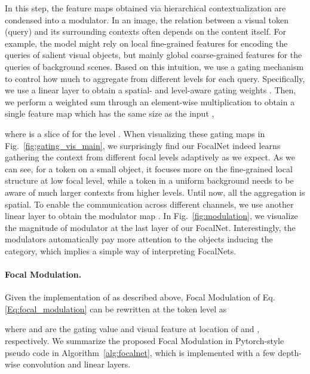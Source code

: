 \documentclass{article}
\begin{document}
In this step, the  feature maps obtained via hierarchical contextualization are condensed into a {modulator}.
In an image, the relation between a visual token (query) and its surrounding contexts often depends on the content itself. For example, the model might rely on local fine-grained features for encoding the queries of salient visual objects, but mainly global coarse-grained features for the queries of background scenes.
Based on this intuition, we use a gating mechanism to control how much to aggregate from different levels for each query. 
Specifically, we use a linear layer to obtain a spatial- and level-aware gating weights . Then, we perform a weighted sum through an element-wise multiplication to obtain a single feature map  which has the same size as the input ,

where  is a slice of  for the level . When visualizing these gating maps in Fig.~\ref{fig:gating_vis_main}, we surprisingly find our FocalNet indeed learns gathering the context from different focal levels adaptively as we expect. As we can see, for a token on a small object, it focuses more on the fine-grained local structure at low focal level, while a token in a uniform background needs to be aware of much larger contexts from higher levels. 
Until now, all the aggregation is spatial. To enable the communication across different channels, we use another linear layer  to obtain the modulator map . In Fig.~\ref{fig:modulation}, we visualize the magnitude of modulator  at the last layer of our FocalNet. Interestingly, the modulators automatically pay more attention to the objects inducing the category, which implies a simple way of interpreting FocalNets.

\paragraph{Focal Modulation.} Given the implementation of  as described above, Focal Modulation of Eq.\eqref{Eq:focal_modulation} can be rewritten at the token level as

where  and  are the gating value and visual feature at location  of  and , respectively. We summarize the proposed Focal Modulation in Pytorch-style pseudo code in Algorithm~\ref{alg:focalnet}, which is implemented with a few depth-wise convolution and linear layers.
\end{document}
